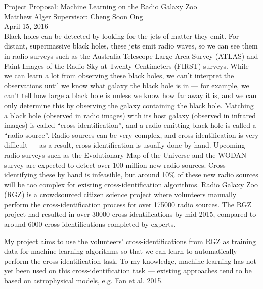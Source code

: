 \documentclass[a4paper]{article}
\begin{document}
    {\Large\noindent  Project Proposal: Machine Learning on the Radio Galaxy Zoo}\\

    {\large\noindent  Matthew Alger \hfill Supervisor: Cheng Soon Ong}\\

    {\large\noindent  April 15, 2016}\\

    Black holes can be detected by looking for the jets of matter they emit. For distant, supermassive black holes, these jets emit radio waves, so we can see them in radio surveys such as the Australia Telescope Large Area Survey (ATLAS)\cite{norris06} and Faint Images of the Radio Sky at Twenty-Centimeters (FIRST)\cite{becker95} surveys. While we can learn a lot from observing these black holes, we can't interpret the observations until we know what galaxy the black hole is in --- for example, we can't tell how large a black hole is unless we know how far away it is, and we can only determine this by observing the galaxy containing the black hole\cite{galaxyzoo}. Matching a black hole (observed in radio images) with its host galaxy (observed in infrared images) is called ``cross-identification'', and a radio-emitting black hole is called a ``radio source''. Radio sources can be very complex, and cross-identification is very difficult --- as a result, cross-identification is usually done by hand\cite{banfield15}. Upcoming radio surveys such as the Evolutionary Map of the Universe\cite{norris11} and the WODAN survey\cite{röttgering11} are expected to detect over 100 million new radio sources. Cross-identifying these by hand is infeasible, but around 10\% of these new radio sources will be too complex for existing cross-identification algorithms\cite{banfield15, norris11}. Radio Galaxy Zoo (RGZ)\cite{banfield15} is a crowdsourced citizen science project where volunteers manually perform the cross-identification process for over 175000 radio sources. The RGZ project had resulted in over 30000 cross-identifications by mid 2015, compared to around 6000 cross-identifications completed by experts\cite{banfield15}.

    My project aims to use the volunteers' cross-identifications from RGZ as training data for machine learning algorithms so that we can learn to automatically perform the cross-identification task. To my knowledge, machine learning has not yet been used on this cross-identification task --- existing approaches tend to be based on astrophysical models, e.g. Fan et al. 2015\cite{fan15}.
\end{document}
